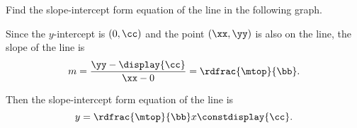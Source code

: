 





\pgfmathsetmacro{\mm}{\mtop/\bb}


\pgfmathtruncatemacro{\xx}{\bb}
\pgfmathtruncatemacro{\yy}{\mtop+\cc}


Find the slope-intercept form equation of the line in the following graph.
\begin{center}
\end{center}

\begin{solution}
Since the $y$-intercept is $(0, \cc)$ and the point $(\xx, \yy)$ is also on the line, the slope of the line is  
\[
m=\frac{\yy-\display{\cc}}{\xx-0}=\rdfrac{\mtop}{\bb}.
\]

Then the slope-intercept form equation of the line is
\[
	y=\rdfrac{\mtop}{\bb} x \constdisplay{\cc}.
\]
\end{solution}